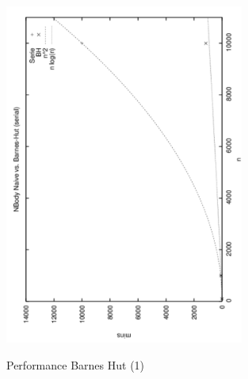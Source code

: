 


\begin{figure}[!htbp]
  \centering
  \includegraphics[angle=270,origin=c,width=0.7\textwidth]{graphics/rendimiento1.png}
  \label{fig:perf-bh-1}
  \caption{Performance Barnes Hut (1)}
\end{figure}


